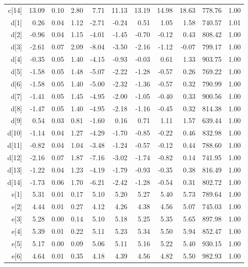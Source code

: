 \begin{longtable}{rrrrrrrrrrr}
  c[14] & 13.09 & 0.10 & 2.80 & 7.71 & 11.13 & 13.19 & 14.98 & 18.63 & 778.76 & 1.00 \\ 
  d[1] & 0.26 & 0.04 & 1.12 & -2.71 & -0.24 & 0.51 & 1.05 & 1.58 & 740.57 & 1.01 \\ 
  d[2] & -0.96 & 0.04 & 1.15 & -4.01 & -1.45 & -0.70 & -0.12 & 0.43 & 808.42 & 1.00 \\ 
  d[3] & -2.61 & 0.07 & 2.09 & -8.04 & -3.50 & -2.16 & -1.12 & -0.07 & 799.17 & 1.00 \\ 
  d[4] & -0.35 & 0.05 & 1.40 & -4.15 & -0.93 & -0.03 & 0.61 & 1.33 & 903.75 & 1.00 \\ 
  d[5] & -1.58 & 0.05 & 1.48 & -5.07 & -2.22 & -1.28 & -0.57 & 0.26 & 769.22 & 1.00 \\ 
  d[6] & -1.58 & 0.05 & 1.40 & -5.00 & -2.32 & -1.36 & -0.57 & 0.32 & 790.99 & 1.00 \\ 
  d[7] & -1.41 & 0.05 & 1.45 & -4.95 & -2.00 & -1.05 & -0.40 & 0.33 & 900.56 & 1.00 \\ 
  d[8] & -1.47 & 0.05 & 1.40 & -4.95 & -2.18 & -1.16 & -0.45 & 0.32 & 814.38 & 1.00 \\ 
  d[9] & 0.54 & 0.03 & 0.81 & -1.60 & 0.16 & 0.71 & 1.11 & 1.57 & 639.44 & 1.00 \\ 
  d[10] & -1.14 & 0.04 & 1.27 & -4.29 & -1.70 & -0.85 & -0.22 & 0.46 & 832.98 & 1.00 \\ 
  d[11] & -0.82 & 0.04 & 1.04 & -3.48 & -1.24 & -0.57 & -0.12 & 0.44 & 788.60 & 1.00 \\ 
  d[12] & -2.16 & 0.07 & 1.87 & -7.16 & -3.02 & -1.74 & -0.82 & 0.14 & 741.95 & 1.00 \\ 
  d[13] & -1.22 & 0.04 & 1.23 & -4.19 & -1.79 & -0.93 & -0.35 & 0.38 & 816.49 & 1.00 \\ 
  d[14] & -1.73 & 0.06 & 1.70 & -6.21 & -2.42 & -1.28 & -0.54 & 0.31 & 802.72 & 1.00 \\ 
  e[1] & 5.31 & 0.01 & 0.17 & 5.10 & 5.20 & 5.27 & 5.40 & 5.73 & 789.64 & 1.00 \\ 
  e[2] & 4.44 & 0.01 & 0.27 & 4.12 & 4.26 & 4.38 & 4.56 & 5.07 & 745.03 & 1.00 \\ 
  e[3] & 5.28 & 0.00 & 0.14 & 5.10 & 5.18 & 5.25 & 5.35 & 5.65 & 897.98 & 1.00 \\ 
  e[4] & 5.39 & 0.01 & 0.22 & 5.11 & 5.23 & 5.34 & 5.50 & 5.94 & 852.47 & 1.00 \\ 
  e[5] & 5.17 & 0.00 & 0.09 & 5.06 & 5.11 & 5.16 & 5.22 & 5.40 & 930.15 & 1.00 \\ 
  e[6] & 4.64 & 0.01 & 0.35 & 4.18 & 4.39 & 4.56 & 4.82 & 5.50 & 982.93 & 1.00 \\ 

\end{longtable}
